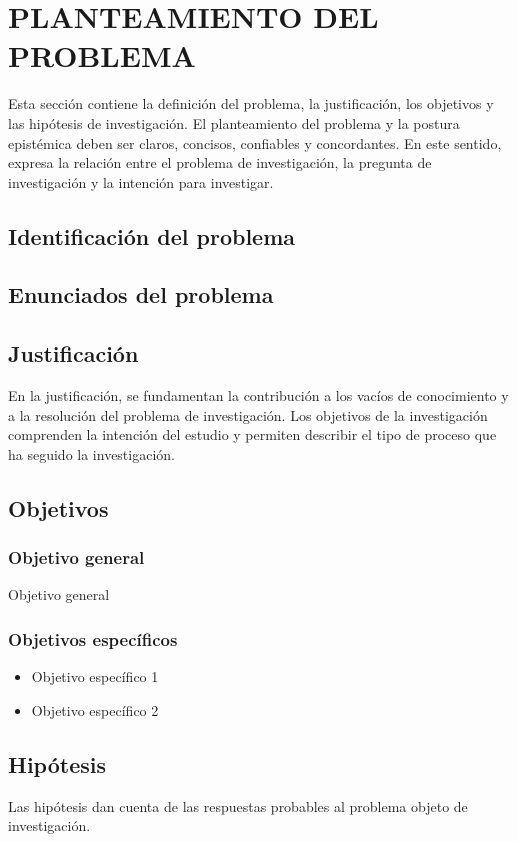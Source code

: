 \titlespacing{\chapter}{0pt}{120pt}{7pt}
\chapter{PLANTEAMIENTO DEL PROBLEMA}
\label{cap:problema}

Esta sección contiene la definición del problema, la justificación, los objetivos y las hipótesis de investigación.
El planteamiento del problema y la postura epistémica deben ser claros, concisos, confiables y concordantes. En este sentido, expresa la relación entre el problema de investigación, la pregunta de investigación y la intención para investigar.


\section{Identificación del problema}

\section{Enunciados del problema}

\section{Justificación}
    
    En la justificación, se fundamentan la contribución a los vacíos de conocimiento y a la resolución del problema de investigación. Los objetivos de la investigación comprenden la intención del estudio y permiten describir el tipo de proceso que ha seguido la investigación. 
    
\section{Objetivos}
    \subsection{Objetivo general}
    \begin{adjustwidth}{2em}{0pt}
    Objetivo general
    \end{adjustwidth}
    
    
    \subsection{Objetivos específicos}
    \begin{adjustwidth}{2em}{0pt}
    \begin{itemize}
        \item Objetivo específico 1
        \item Objetivo específico 2
    \end{itemize}
    \end{adjustwidth}
    
    
\section{Hipótesis}

    Las hipótesis dan cuenta de las respuestas probables al problema objeto de investigación.